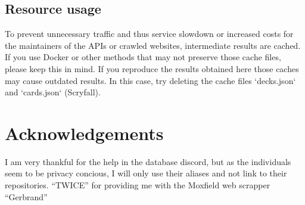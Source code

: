 \documentclass[a4]{article}
\begin{document}
\subsection{Resource usage}
To prevent unnecessary traffic and thus service slowdown or increased costs for the maintainers of the APIs or crawled websites, intermediate results are cached.
If you use Docker or other methods that may not preserve those cache files, please keep this in mind.
If you reproduce the results obtained here those caches may cause outdated results.
In this case, try deleting the cache files `decks.json` and `cards.json` (Scryfall).

\section{Acknowledgements}
I am very thankful for the help in the database discord, but as the individuals seem to be privacy concious, I will only use their aliases and not link to their repositories.
\enquote{TWICE} for providing me with the Moxfield web scrapper
\enquote{Gerbrand}
\end{document}

